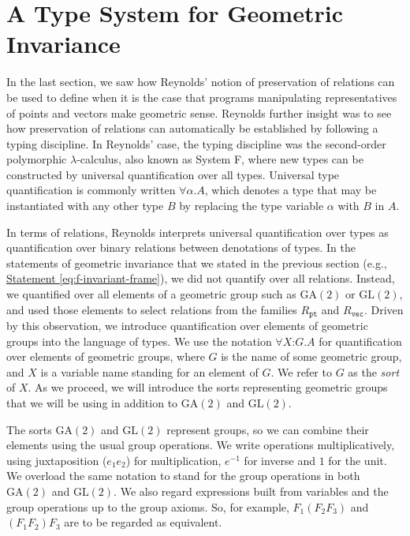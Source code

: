 \documentclass{article}
\newcommand{\GA}{\mathrm{GA}}
\newcommand{\GL}{\mathrm{GL}}
\newcommand{\statementref}[1]{\hyperref[#1]{Statement \ref*{#1}}}
\begin{document}
\section{A Type System for Geometric Invariance}
\label{sec:type-system-geom-intro}

In the last section, we saw how Reynolds' notion of preservation of
relations can be used to define when it is the case that programs
manipulating representatives of points and vectors make geometric
sense. Reynolds further insight was to see how preservation of
relations can automatically be established by following a typing
discipline. In Reynolds' case, the typing discipline was the
second-order polymorphic $\lambda$-calculus, also known as System F,
where new types can be constructed by universal quantification over
all types. Universal type quantification is commonly written $\forall
\alpha. A$, which denotes a type that may be instantiated with any
other type $B$ by replacing the type variable $\alpha$ with $B$ in
$A$.

In terms of relations, Reynolds interprets universal quantification
over types as quantification over binary relations between denotations
of types. In the statements of geometric invariance that we stated in
the previous section (e.g., \statementref{eq:f-invariant-frame}), we
did not quantify over all relations. Instead, we quantified over all
elements of a geometric group such as $\GA(2)$ or $\GL(2)$, and used
those elements to select relations from the families $R_{\texttt{pt}}$
and $R_{\texttt{vec}}$. Driven by this observation, we introduce
quantification over elements of geometric groups into the language of
types. We use the notation $\forall X \mathord: G. A$ for
quantification over elements of geometric groups, where $G$ is the
name of some geometric group, and $X$ is a variable name standing for
an element of $G$. We refer to $G$ as the \emph{sort} of $X$. As we
proceed, we will introduce the sorts representing geometric groups
that we will be using in addition to $\GA(2)$ and $\GL(2)$.

The sorts $\GA(2)$ and $\GL(2)$ represent groups, so we can combine
their elements using the usual group operations. We write operations
multiplicatively, using juxtaposition ($e_1e_2$) for multiplication,
$e^{-1}$ for inverse and $1$ for the unit. We overload the same
notation to stand for the group operations in both $\GA(2)$ and
$\GL(2)$. We also regard expressions built from variables and the
group operations up to the group axioms. So, for example,
$F_1(F_2F_3)$ and $(F_1F_2)F_3$ are to be regarded as equivalent.
\end{document}
